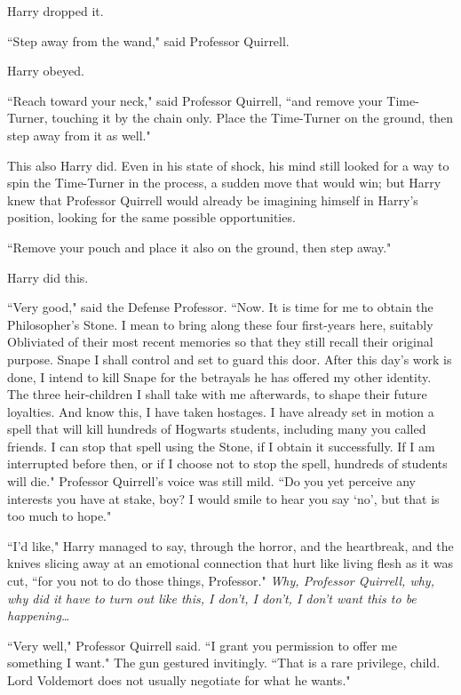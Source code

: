 Harry dropped it.

``Step away from the wand," said Professor Quirrell.

Harry obeyed.

``Reach toward your neck," said Professor Quirrell, ``and remove your Time-Turner, touching it by the chain only. Place the Time-Turner on the ground, then step away from it as well."

This also Harry did. Even in his state of shock, his mind still looked for a way to spin the Time-Turner in the process, a sudden move that would win; but Harry knew that Professor Quirrell would already be imagining himself in Harry's position, looking for the same possible opportunities.

``Remove your pouch and place it also on the ground, then step away."

Harry did this.

``Very good," said the Defense Professor. ``Now. It is time for me to obtain the Philosopher's Stone. I mean to bring along these four first-years here, suitably Obliviated of their most recent memories so that they still recall their original purpose. Snape I shall control and set to guard this door. After this day's work is done, I intend to kill Snape for the betrayals he has offered my other identity. The three heir-children I shall take with me afterwards, to shape their future loyalties. And know this, I have taken hostages. I have already set in motion a spell that will kill hundreds of Hogwarts students, including many you called friends. I can stop that spell using the Stone, if I obtain it successfully. If I am interrupted before then, or if I choose not to stop the spell, hundreds of students will die." Professor Quirrell's voice was still mild. ``Do you yet perceive any interests you have at stake, boy? I would smile to hear you say `no', but that is too much to hope."

``I'd like," Harry managed to say, through the horror, and the heartbreak, and the knives slicing away at an emotional connection that hurt like living flesh as it was cut, ``for you not to do those things, Professor." \emph{Why, Professor Quirrell, why, why did it have to turn out like this, I don't, I don't, I don't want this to be happening{\ldots}}

``Very well," Professor Quirrell said. ``I grant you permission to offer me something I want." The gun gestured invitingly. ``That is a rare privilege, child. Lord Voldemort does not usually negotiate for what he wants."

